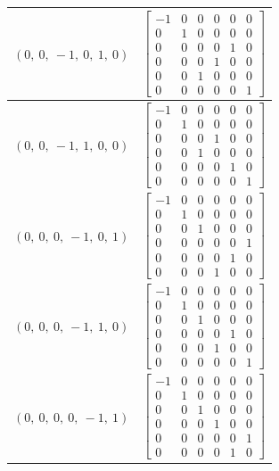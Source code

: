 \documentclass[11pt]{article}
\theoremstyle{definition}
\begin{document}
\begin{longtable}{|l|c|}
    \hline
    $\left( 0, \  0, \  -1, \  0, \  1, \  0\right)$ & ${\left[\begin{matrix}-1 & 0 & 0 & 0 & 0 & 0\\0 & 1 & 0 & 0 & 0 & 0\\0 & 0 & 0 & 0 & 1 & 0\\0 & 0 & 0 & 1 & 0 & 0\\0 & 0 & 1 & 0 & 0 & 0\\0 & 0 & 0 & 0 & 0 & 1\end{matrix}\right]}$ \\
    \hline
    $\left( 0, \  0, \  -1, \  1, \  0, \  0\right)$ & ${\left[\begin{matrix}-1 & 0 & 0 & 0 & 0 & 0\\0 & 1 & 0 & 0 & 0 & 0\\0 & 0 & 0 & 1 & 0 & 0\\0 & 0 & 1 & 0 & 0 & 0\\0 & 0 & 0 & 0 & 1 & 0\\0 & 0 & 0 & 0 & 0 & 1\end{matrix}\right]}$ \\
    \hline
    $\left( 0, \  0, \  0, \  -1, \  0, \  1\right)$ & ${\left[\begin{matrix}-1 & 0 & 0 & 0 & 0 & 0\\0 & 1 & 0 & 0 & 0 & 0\\0 & 0 & 1 & 0 & 0 & 0\\0 & 0 & 0 & 0 & 0 & 1\\0 & 0 & 0 & 0 & 1 & 0\\0 & 0 & 0 & 1 & 0 & 0\end{matrix}\right]}$ \\
    \hline
    $\left( 0, \  0, \  0, \  -1, \  1, \  0\right)$ & ${\left[\begin{matrix}-1 & 0 & 0 & 0 & 0 & 0\\0 & 1 & 0 & 0 & 0 & 0\\0 & 0 & 1 & 0 & 0 & 0\\0 & 0 & 0 & 0 & 1 & 0\\0 & 0 & 0 & 1 & 0 & 0\\0 & 0 & 0 & 0 & 0 & 1\end{matrix}\right]}$ \\
    \hline
    $\left( 0, \  0, \  0, \  0, \  -1, \  1\right)$ & ${\left[\begin{matrix}-1 & 0 & 0 & 0 & 0 & 0\\0 & 1 & 0 & 0 & 0 & 0\\0 & 0 & 1 & 0 & 0 & 0\\0 & 0 & 0 & 1 & 0 & 0\\0 & 0 & 0 & 0 & 0 & 1\\0 & 0 & 0 & 0 & 1 & 0\end{matrix}\right]}$ \\

\end{longtable}
\end{document}
